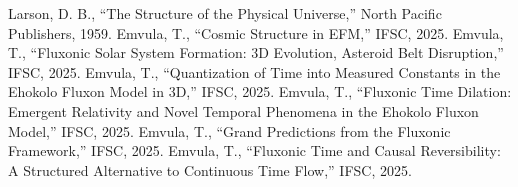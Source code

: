 \documentclass[11pt]{article}
\begin{document}
\begin{thebibliography}{7}
 Larson, D. B., ``The Structure of the Physical Universe,'' North Pacific Publishers, 1959.
 Emvula, T., ``Cosmic Structure in EFM,'' IFSC, 2025.
 Emvula, T., ``Fluxonic Solar System Formation: 3D Evolution, Asteroid Belt Disruption,'' IFSC, 2025.
 Emvula, T., ``Quantization of Time into Measured Constants in the Ehokolo Fluxon Model in 3D,'' IFSC, 2025.
 Emvula, T., ``Fluxonic Time Dilation: Emergent Relativity and Novel Temporal Phenomena in the Ehokolo Fluxon Model,'' IFSC, 2025.
 Emvula, T., ``Grand Predictions from the Fluxonic Framework,'' IFSC, 2025.
 Emvula, T., ``Fluxonic Time and Causal Reversibility: A Structured Alternative to Continuous Time Flow,'' IFSC, 2025.
\end{thebibliography}
\end{document}
